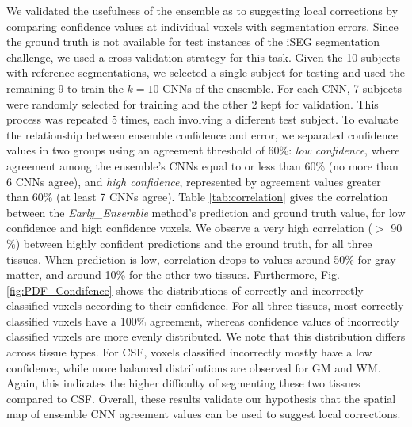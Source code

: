 \documentclass[twoside,espcrc2]{elsarticle}
\begin{document}
We validated the usefulness of the ensemble as to suggesting local corrections by comparing confidence values at individual voxels with segmentation errors. Since the ground truth is not available for test instances of the iSEG segmentation challenge, we used a cross-validation strategy for this task. Given the 10 subjects with reference segmentations, we selected a single subject for testing and used the remaining 9 to train the $k=10$ CNNs of the ensemble. For each CNN, 7 subjects were randomly selected for training and the other 2 kept for validation. This process was repeated 5 times, each involving a different test subject. To evaluate the relationship between ensemble confidence and error, we separated confidence values in two groups using an agreement threshold of 60\%:  \emph{low confidence}, where agreement among the ensemble's CNNs equal to or less than 60$\%$ (no more than 6 CNNs agree), and \emph{high confidence}, represented by agreement values greater than 60$\%$ (at least 7 CNNs agree).
Table \ref{tab:correlation} gives the correlation between the \textit{Early\_Ensemble} method's prediction and ground truth value, for low confidence and high confidence voxels. We observe a very high correlation ($>$ 90$\%$) between highly confident predictions and the ground truth, for all three tissues. When prediction is low, correlation drops to values around 50$\%$ for gray matter, and around 10$\%$ for the other two tissues. Furthermore, Fig. \ref{fig:PDF_Condifence} shows the distributions of correctly and incorrectly classified voxels according to their confidence. For all three tissues, most correctly classified voxels have a 100$\%$ agreement, whereas confidence values of incorrectly classified voxels are more evenly distributed. We note that this distribution differs across tissue types. For CSF, voxels classified incorrectly mostly have a low confidence, while more balanced distributions are observed for GM and WM. Again, this indicates the higher difficulty of segmenting these two tissues compared to CSF. Overall, these results validate our hypothesis that the spatial map of ensemble CNN agreement values can be used to suggest local corrections. 
\end{document}
